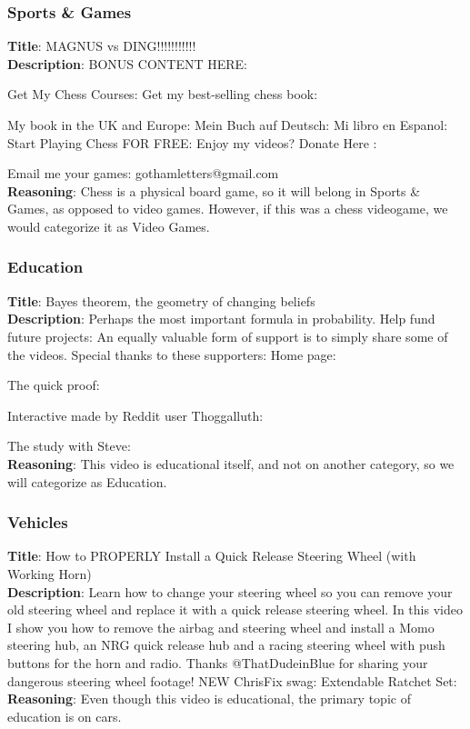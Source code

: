 \documentclass[11pt]{article}
\begin{document}
\subsubsection{Sports \& Games}
\textbf{Title}:  MAGNUS vs DING!!!!!!!!!!!\\
\textbf{Description}: BONUS CONTENT HERE:

Get My Chess Courses: 
Get my best-selling chess book: 

My book in the UK and Europe: 
Mein Buch auf Deutsch: 
Mi libro en Espanol: 
Start Playing Chess FOR FREE: 
Enjoy my videos? Donate Here : 

Email me your games: gothamletters@gmail.com
\\
\textbf{Reasoning}: Chess is a physical board game, so it will belong in Sports \& Games, as opposed to video games. However, if this was a chess videogame, we would categorize it as Video Games. 

\subsubsection{Education}
\textbf{Title}:  Bayes theorem, the geometry of changing beliefs\\
\textbf{Description}: Perhaps the most important formula in probability.
Help fund future projects:
An equally valuable form of support is to simply share some of the videos.
Special thanks to these supporters:
Home page:

The quick proof:

Interactive made by Reddit user Thoggalluth:

The study with Steve:\\
\textbf{Reasoning}: This video is educational itself, and not on another category, so we will categorize as Education.

\subsubsection{Vehicles}
\textbf{Title}:  How to PROPERLY Install a Quick Release Steering Wheel (with Working Horn) \\
\textbf{Description}: Learn how to change your steering wheel so you can remove your old steering wheel and replace it with a quick release steering wheel. In this video I show you how to remove the airbag and steering wheel and install a Momo steering hub, an NRG quick release hub and a racing steering wheel with push buttons for the horn and radio.
Thanks @ThatDudeinBlue  for sharing your dangerous steering wheel footage!
NEW ChrisFix swag: 
Extendable Ratchet Set: \\
\textbf{Reasoning}: Even though this video is educational, the primary topic of education is on cars. 
\end{document}
